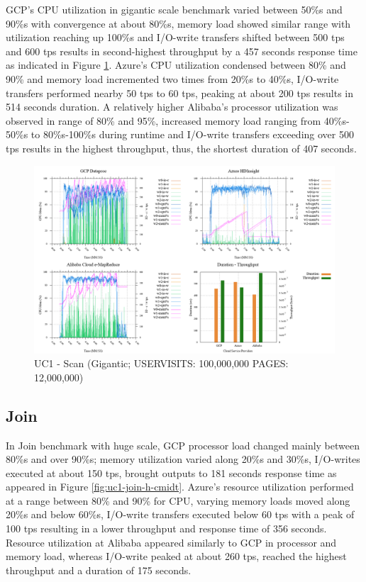 \documentclass[review]{elsarticle}
\begin{document}
GCP's CPU utilization in gigantic scale benchmark varied between 50\%s and 90\%s with convergence at about 80\%s, memory load showed similar range with utilization reaching up 100\%s and I/O-write transfers shifted between 500 tps and 600 tps results in second-highest throughput by a 457 seconds response time as indicated in Figure \ref{fig:uc1-scan-g-cmidt}. Azure's CPU utilization condensed between 80\% and 90\% and memory load incremented two times from 20\%s to 40\%s, I/O-write transfers performed nearby 50 tps to 60 tps, peaking at about 200 tps results in 514 seconds duration. A relatively higher Alibaba's processor utilization was observed in range of 80\% and 95\%, increased memory load ranging from 40\%s-50\%s to 80\%s-100\%s during runtime and I/O-write transfers exceeding over 500 tps results in the highest throughput, thus, the shortest duration of 407 seconds.

\begin{figure}[p]
	\caption{UC1 - Scan (Gigantic; USERVISITS: 100,000,000 PAGES: 12,000,000)}
	\label{fig:uc1-scan-g-cmidt}
	\includegraphics[width=\textwidth]{uc1-scan-g-cmidt}
	\centering
\end{figure}

\subsection{Join}
In Join benchmark with huge scale, GCP processor load changed mainly between 80\%s and over 90\%s; memory utilization varied along 20\%s and 30\%s, I/O-writes executed at about 150 tps, brought outputs to 181 seconds response time as appeared in Figure \ref{fig:uc1-join-h-cmidt}. Azure's resource utilization performed at a range between 80\% and 90\% for CPU, varying memory loads moved along 20\%s and below 60\%s, I/O-write transfers executed below 60 tps with a peak of 100 tps resulting in a lower throughput and response time of 356 seconds. Resource utilization at Alibaba appeared similarly to GCP in processor and memory load, whereas I/O-write peaked at about 260 tps, reached the highest throughput and a duration of 175 seconds.
\end{document}

